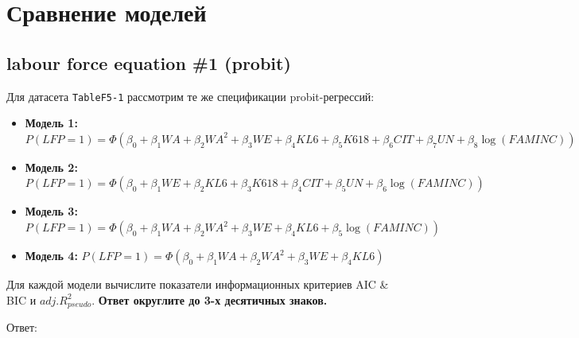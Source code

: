 \documentclass[
  russian,
]{article}
\providecommand{\tightlist}{%
  \setlength{\itemsep}{0pt}\setlength{\parskip}{0pt}}
\begin{document}
\section{Сравнение
моделей}\label{ux441ux440ux430ux432ux43dux435ux43dux438ux435-ux43cux43eux434ux435ux43bux435ux439}

\subsection{labour force equation \#1
(probit)}\label{labour-force-equation-1-probit-1}

Для датасета \texttt{TableF5-1} рассмотрим те же спецификации
probit-регрессий:

\begin{itemize}
\tightlist
\item
  \textbf{Модель 1:}
  \(P(LFP=1) = \Phi(\beta_0 + \beta_1 WA + \beta_2 WA^2 + \beta_3 WE + \beta_4 KL6 + \beta_5 K618 + \beta_6 CIT + \beta_7 UN + \beta_8 \log(FAMINC))\)
\item
  \textbf{Модель 2:}
  \(P(LFP=1) = \Phi(\beta_0 + \beta_1 WE + \beta_2 KL6 + \beta_3 K618 + \beta_4 CIT + \beta_5 UN + \beta_6 \log(FAMINC))\)
\item
  \textbf{Модель 3:}
  \(P(LFP=1) = \Phi(\beta_0 + \beta_1 WA + \beta_2 WA^2 + \beta_3 WE + \beta_4 KL6 + \beta_5 \log(FAMINC))\)
\item
  \textbf{Модель 4:}
  \(P(LFP=1) = \Phi(\beta_0 + \beta_1 WA + \beta_2 WA^2 + \beta_3 WE + \beta_4 KL6)\)
\end{itemize}

Для каждой модели вычислите показатели информационных критериев AIC \&
BIC и \(adj.R^2_{pseudo}\). \textbf{Ответ округлите до 3-х десятичных
знаков.}

Ответ:
\end{document}
